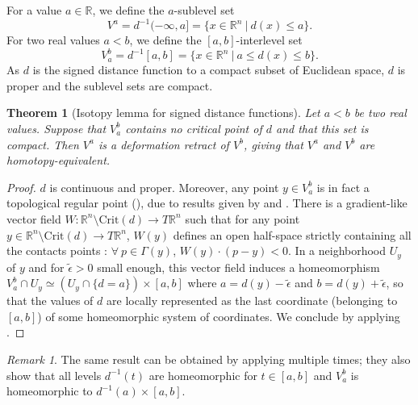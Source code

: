 \documentclass[11pt]{article}
\newcommand{\R}{\mathbb{R}}
\newcommand{\eps}{\epsilon}
\newcommand{\inter}{\cap}
\theoremstyle{plain}
\newtheorem{thm}{Theorem}
\theoremstyle{definition}
\theoremstyle{remark}
\newtheorem{rmk}{Remark}
\begin{document}
	For a value $a \in \R$, we define the $a$-sublevel set
	\[V^a = d^{-1}(-\infty,a] = \{ x \in \R^n ~|~ d(x) \leq a \}. \]
	For two real values $a < b$, we define the $[a,b]$-interlevel set
	\[ V_a^b = d^{-1}[a,b] = \{ x \in \R^n ~|~ a \leq d(x) \leq b \}.  \]
	As $d$ is the signed distance function to a compact subset of Euclidean space, $d$ is proper and
	the sublevel sets are compact.
	
	\begin{thm}[Isotopy lemma for signed distance functions]
		\label{thm:dist_isotopy_lemma}
		Let $a < b$ be two real values. Suppose that $V_a^b$ contains no critical point of $d$ and that this set is compact. 
		Then $V^a$ is a deformation retract of $V^b$, giving that $V^a$ and $V^b$ are homotopy-equivalent.
	\end{thm}
	\begin{proof}
		
		$d$ is continuous and proper. Moreover, any point $y \in V_a^b$ is in fact a topological regular point (), due to results given by \cite{cheeger_critical_1991} and \cite{grove_critical_1993}. There is a gradient-like vector field $W : \R^n \setminus \mathrm{Crit}(d) \to T\R^n$ such that for any point $y \in \R^n \setminus \mathrm{Crit}(d) \to T\R^n$, $W(y)$ defines an open half-space strictly containing all the contacts points : $\forall\ p \in \Gamma(y)$,
		$W(y) \cdot (p-y) < 0$. In a neighborhood $U_y$ of $y$ and for $\tilde{\eps} > 0$ small enough, this vector field induces a homeomorphism $V_{a}^b \inter U_y \simeq (U_y \inter \{d = a\}) \times [a,b]$ where $a = d(y) - \tilde{\eps}$ and $b = d(y) + \tilde{\eps}$, so that the values of $d$ are locally represented as the last coordinate (belonging to $[a,b]$) of some homeomorphic system of coordinates. We conclude by applying .
	\end{proof}
	
	\begin{rmk}
		The same result can be obtained by applying \cite[Proposition 1.8]{grove_critical_1993} multiple times; they also show that all levels $d^{-1}(t)$ are homeomorphic for $t \in [a,b]$ and $V_a^b$ is homeomorphic to $d^{-1}(a) \times [a,b]$.
	\end{rmk}
	
\end{document}
